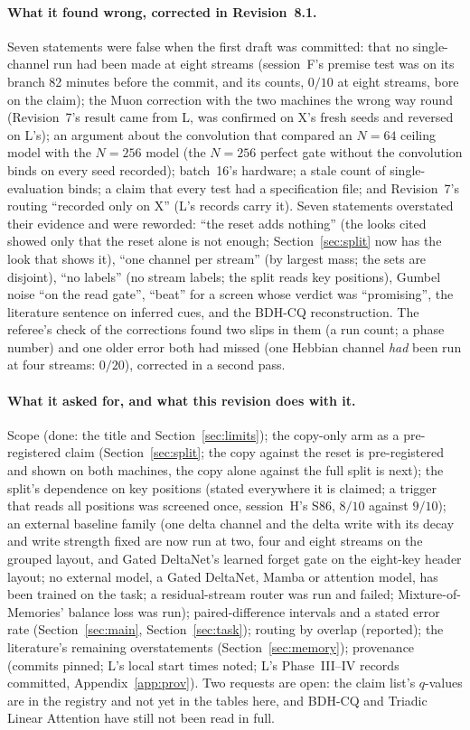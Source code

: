 \documentclass[11pt]{article}
\begin{document}
\paragraph{What it found wrong, corrected in Revision~8.1.} Seven statements were false when the first draft was committed: that no single-channel run had been made at eight streams (session~F's premise test was on its branch 82 minutes before the commit, and its counts, $0/10$ at eight streams, bore on the claim); the Muon correction with the two machines the wrong way round (Revision~7's result came from L, was confirmed on X's fresh seeds and reversed on L's); an argument about the convolution that compared an $N = 64$ ceiling model with the $N = 256$ model (the $N = 256$ perfect gate without the convolution binds on every seed recorded); batch~16's hardware; a stale count of single-evaluation binds; a claim that every test had a specification file; and Revision~7's routing ``recorded only on X'' (L's records carry it). Seven statements overstated their evidence and were reworded: ``the reset adds nothing'' (the looks cited showed only that the reset alone is not enough; Section~\ref{sec:split} now has the look that shows it), ``one channel per stream'' (by largest mass; the sets are disjoint), ``no labels'' (no stream labels; the split reads key positions), Gumbel noise ``on the read gate'', ``beat'' for a screen whose verdict was ``promising'', the literature sentence on inferred cues, and the BDH-CQ reconstruction. The referee's check of the corrections found two slips in them (a run count; a phase number) and one older error both had missed (one Hebbian channel \emph{had} been run at four streams: $0/20$), corrected in a second pass.

\paragraph{What it asked for, and what this revision does with it.} Scope (done: the title and Section~\ref{sec:limits}); the copy-only arm as a pre-registered claim (Section~\ref{sec:split}; the copy against the reset is pre-registered and shown on both machines, the copy alone against the full split is next); the split's dependence on key positions (stated everywhere it is claimed; a trigger that reads all positions was screened once, session~H's S86, $8/10$ against $9/10$); an external baseline family (one delta channel and the delta write with its decay and write strength fixed are now run at two, four and eight streams on the grouped layout, and Gated DeltaNet's learned forget gate on the eight-key header layout; no external model, a Gated DeltaNet, Mamba or attention model, has been trained on the task; a residual-stream router was run and failed; Mixture-of-Memories' balance loss was run); paired-difference intervals and a stated error rate (Section~\ref{sec:main}, Section~\ref{sec:task}); routing by overlap (reported); the literature's remaining overstatements (Section~\ref{sec:memory}); provenance (commits pinned; L's local start times noted; L's Phase~III--IV records committed, Appendix~\ref{app:prov}). Two requests are open: the claim list's $q$-values are in the registry and not yet in the tables here, and BDH-CQ and Triadic Linear Attention have still not been read in full.
\end{document}
